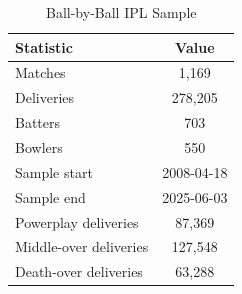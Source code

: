 \begin{table}[H]
\centering
\caption{Ball-by-Ball IPL Sample}
\begin{tabular}{lc}
\toprule
Statistic & Value \\
\midrule
Matches & 1,169 \\
Deliveries & 278,205 \\
Batters & 703 \\
Bowlers & 550 \\
Sample start & 2008-04-18 \\
Sample end & 2025-06-03 \\
Powerplay deliveries & 87,369 \\
Middle-over deliveries & 127,548 \\
Death-over deliveries & 63,288 \\
\bottomrule
\end{tabular}
\end{table}
